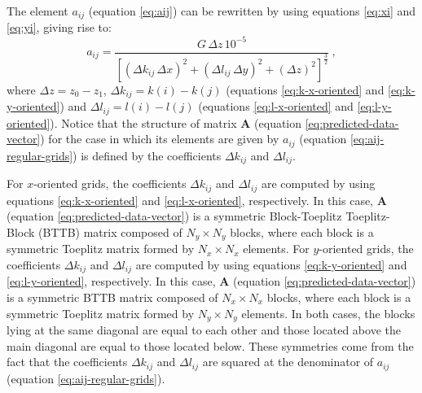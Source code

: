 \documentclass[manuscript,revised]{geophysics}
\begin{document}
The element $a_{ij}$ (equation \ref{eq:aij}) can be rewritten 
by using equations \ref{eq:xi} and \ref{eq:yi}, giving rise to:
\begin{equation}
a_{ij} = \frac{G \, \Delta z \, 10^{-5}}{ \left[ 
\left( \Delta k_{ij} \, \Delta x \right)^{2} + 
\left( \Delta l_{ij} \, \Delta y \right)^{2} + 
\left( \Delta z \right)^{2} \right]^{\frac{3}{2}}} \: ,
\label{eq:aij-regular-grids}
\end{equation}
where $\Delta z = z_{0} - z_{1}$, 
$\Delta k_{ij} = k(i) - k(j)$ (equations \ref{eq:k-x-oriented} and \ref{eq:k-y-oriented}) and
$\Delta l_{ij} = l(i) - l(j)$ (equations \ref{eq:l-x-oriented} and \ref{eq:l-y-oriented}).
Notice that the structure of matrix $\mathbf{A}$ (equation \ref{eq:predicted-data-vector}) for 
the case in which its elements are given by $a_{ij}$ (equation \ref{eq:aij-regular-grids}) is 
defined by the coefficients $\Delta k_{ij}$ and $\Delta l_{ij}$.

For $x$-oriented grids, the coefficients $\Delta k_{ij}$ and $\Delta l_{ij}$ are 
computed by using equations \ref{eq:k-x-oriented} and \ref{eq:l-x-oriented}, respectively.
In this case, $\mathbf{A}$ (equation \ref{eq:predicted-data-vector}) is a 
symmetric Block-Toeplitz Toeplitz-Block (BTTB) matrix \citep[][ p. 67]{chan-jin2007}
composed of $N_{y} \times N_{y}$ blocks, where each block is a symmetric Toeplitz matrix
formed by $N_{x} \times N_{x}$ elements.
For $y$-oriented grids, the coefficients $\Delta k_{ij}$ and $\Delta l_{ij}$ are 
computed by using equations \ref{eq:k-y-oriented} and \ref{eq:l-y-oriented}, respectively.
In this case, $\mathbf{A}$ (equation \ref{eq:predicted-data-vector}) is a 
symmetric BTTB matrix composed of $N_{x} \times N_{x}$ blocks, where each block is a
symmetric Toeplitz matrix formed by $N_{y} \times N_{y}$ elements.
In both cases, the blocks lying at the same diagonal are equal to each other
and those located above the main diagonal are equal to those located below.
These symmetries come from the fact that the coefficients
$\Delta k_{ij}$ and $\Delta l_{ij}$ are squared at the denominator of 
$a_{ij}$ (equation \ref{eq:aij-regular-grids}).
\end{document}
